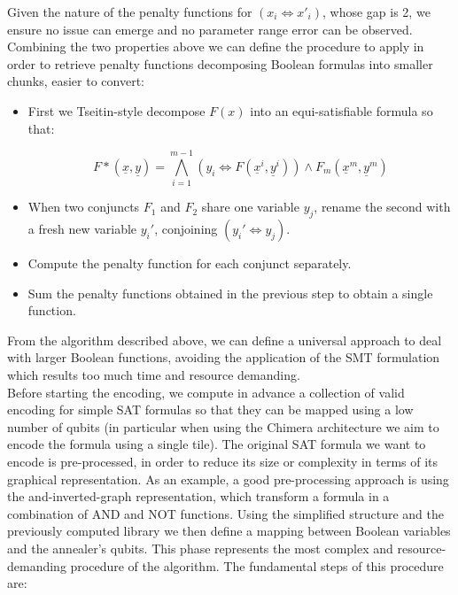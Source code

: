Given the nature of the penalty functions for $(x_i \iff x'_i)$, whose gap is 2, we ensure no issue can emerge and no parameter range error can be observed.
Combining the two properties above we can define the procedure to apply in order to retrieve penalty functions decomposing Boolean formulas into smaller chunks, easier to convert:

\begin{itemize}
    \item First we Tseitin-style decompose $F(x)$ into an equi-satisfiable formula so that:
    
    \begin{equation}
        F*(\underline{x},\underline{y}) = \bigwedge^{m-1}_{i=1} 
        (y_i \iff F(\underline{x}^i,\underline{y}^i)) \wedge F_m(\underline{x}^m,\underline{y}^m)
    \end{equation}
    
    \item When two conjuncts $F_1$ and $F_2$ share one variable $y_j$, rename the second with a fresh new variable $y_i'$, conjoining $(y_i' \iff y_j)$.
    \item Compute the penalty function for each conjunct separately.
    \item Sum the penalty functions obtained in the previous step to obtain a single function. 
\end{itemize}

From the algorithm described above, we can define a universal approach to deal with larger Boolean functions, avoiding the application of the SMT formulation which results too much time and resource demanding. \\
Before starting the encoding, we compute in advance a collection of valid encoding for simple SAT formulas so that they can be mapped using a low number of qubits (in particular when using the Chimera architecture we aim to encode the formula using a single tile). The original SAT formula we want to encode is pre-processed, in order to reduce its size or complexity in terms of its graphical
representation. As an example, a good pre-processing approach is using the and-inverted-graph representation, which transform a formula in a combination of AND and NOT functions. Using the simplified structure and the previously computed library we then define a mapping between Boolean variables and the annealer's qubits. This phase represents the most complex and resource-demanding procedure of the algorithm. The fundamental steps of this procedure are:


